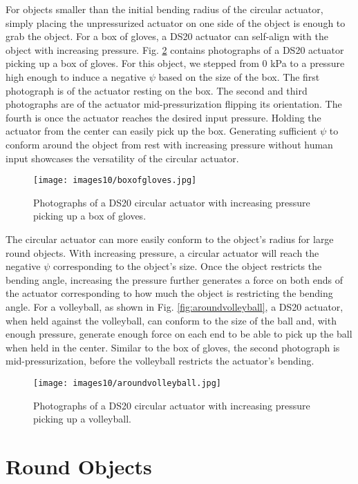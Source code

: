 For objects smaller than the initial bending radius of the circular actuator, simply placing the unpressurized actuator on one side of the object is enough to grab the object. For a box of gloves, a DS20 actuator can self-align with the object with increasing pressure. Fig. \ref{fig:boxofgloves} contains photographs of a DS20 actuator picking up a box of gloves. For this object, we stepped from 0 kPa to a pressure high enough to induce a negative $\psi$ based on the size of the box. The first photograph is of the actuator resting on the box. The second and third photographs are of the actuator mid-pressurization flipping its orientation. The fourth is once the actuator reaches the desired input pressure. Holding the actuator from the center can easily pick up the box. Generating sufficient $\psi$ to conform around the object from rest with increasing pressure without human input showcases the versatility of the circular actuator. 

\begin{figure}[!ht]
    \centering
     \texttt{[image: images10/boxofgloves.jpg]}
    \caption{Photographs of a DS20 circular actuator with increasing pressure picking up a box of gloves.}
    \label{fig:boxofgloves}
\end{figure}

The circular actuator can more easily conform to the object's radius for large round objects. With increasing pressure, a circular actuator will reach the negative $\psi$ corresponding to the object's size. Once the object restricts the bending angle, increasing the pressure further generates a force on both ends of the actuator corresponding to how much the object is restricting the bending angle. For a volleyball, as shown in Fig. \ref{fig:aroundvolleyball}, a DS20 actuator, when held against the volleyball, can conform to the size of the ball and, with enough pressure, generate enough force on each end to be able to pick up the ball when held in the center. Similar to the box of gloves, the second photograph is mid-pressurization, before the volleyball restricts the actuator's bending.

\begin{figure}[!ht]
    \centering
     \texttt{[image: images10/aroundvolleyball.jpg]}
    \caption{Photographs of a DS20 circular actuator with increasing pressure picking up a volleyball.}
    \label{fig:boxofgloves}
\end{figure}

\section{Round Objects}


